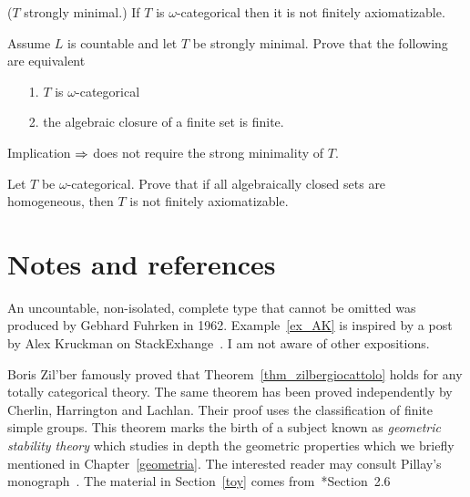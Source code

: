 \begin{theorem}\label{thm_zilbergiocattolo}
  ($T$ strongly minimal.)
  If $T$ is $\omega$-categorical then it is not finitely axiomatizable.
\end{theorem} 

\begin{exercise} 
Assume $L$ is countable and let $T$ be strongly minimal.
Prove that the following are equivalent
\begin{itemize}
\item[1.] $T$ is $\omega$-categorical
\item[2.] the algebraic closure of a finite set is finite.
\end{itemize}
Implication $\Rightarrow$ does not require the strong minimality of $T$.
\end{exercise}

\begin{exercise} 
  Let $T$ be $\omega$-categorical.
  Prove that if all algebraically closed sets are homogeneous, then $T$ is not finitely axiomatizable.
\end{exercise}

\section{Notes and references}
\label{Notes_countable}
An uncountable, non-isolated, complete type that cannot be omitted was produced by Gebhard Fuhrken in 1962.
Example~\ref{ex_AK} is inspired by a post by Alex Kruckman on StackExhange~\cite{AK}.
I am not aware of other expositions.

Boris Zil'ber famously proved that Theorem~\ref{thm_zilbergiocattolo} holds for any totally categorical theory.
The same theorem has been proved independently by Cherlin, Harrington and Lachlan.
Their proof uses the classification of finite simple groups.
This theorem marks the birth of a subject known as \textit{geometric stability theory\/} which studies in depth the geometric properties which we briefly mentioned in Chapter~\ref{geometria}.
The interested reader may consult Pillay's monograph~\cite{Pillay}. 
The material in Section~\ref{toy} comes from~\cite{Pillay}*{Section~2.6} 



\begin{biblist}[]\normalsize
{}\smallskip 
{}\smallskip
\end{biblist}